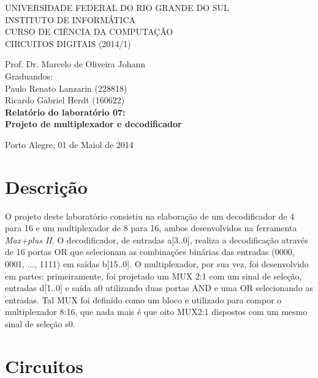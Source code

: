 \documentclass[a4paper]{article}
\begin{document}
\begin{titlepage}
\begin{center}


\large{ 
\uppercase{ Universidade Federal do Rio Grande do Sul\\

Instituto de Informática \\

Curso de Ciência da Computação \\

Circuitos Digitais (2014/1)\\
}

Prof. Dr. Marcelo de Oliveira Johann \\

Graduandos: \\ Paulo Renato Lanzarin (228818)
			\\ Ricardo Gabriel Herdt (160622) \\ [4.5cm]


\LARGE {\bfseries Relatório do laboratório 07: \\
	Projeto de multiplexador e decodificador\\[1.0cm]
}}


\vfill

Porto Alegre, 01 de Maiol de 2014

\end{center}
\end{titlepage}
\section{Descrição}

	O projeto deste laboratório consistiu na elaboração de um decodificador de 4 para 16 e um multiplexador de 8 para 16, ambos desenvolvidos na ferramenta \emph{Max+plus II}. O decodificador, de entradas a[3..0], realiza a decodificação através de 16 portas OR que selecionam  as combinações binárias das entradas (0000, 0001, ..., 1111) em saídas b[15..0]. O multiplexador, por sua vez, foi desenvolvido em partes: primeiramente, foi projetado um MUX 2:1 com um sinal de seleção, entradas d[1..0] e saída a0 utilizando duas portas AND e uma OR selecionando as entradas. Tal MUX foi definido como um bloco e utilizado para compor o multiplexador 8:16, que nada mais é que oito MUX2:1 dispostos com um mesmo sinal de seleção s0.



\FloatBarrier

\section{Circuitos}
\end{document}

